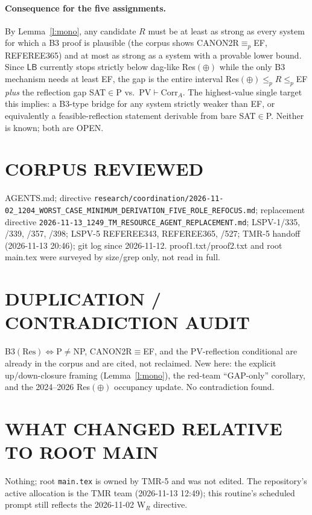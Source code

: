 \documentclass[11pt]{article}
\begin{document}
\paragraph{Consequence for the five assignments.}
By Lemma~\ref{l:mono}, any candidate $R$ must be at least as strong as every
system for which a B3 proof is plausible (the corpus shows CANON2R$\equiv_p$EF,
REFEREE365) and at most as strong as a system with a provable lower bound.
Since $\mathsf{LB}$ currently stops strictly below dag-like Res$(\oplus)$ while
the only B3 mechanism needs at least EF, the gap is the entire interval
Res$(\oplus)\le_p R\le_p$EF \emph{plus} the reflection gap
SAT$\in$P vs.\ PV$\vdash$Corr$_A$. The highest-value single target this
implies: a B3-type bridge for any system strictly weaker than EF, or
equivalently a feasible-reflection statement derivable from bare SAT$\in$P.
Neither is known; both are OPEN.

\section*{CORPUS REVIEWED}
AGENTS.md; directive \texttt{research/coordination/2026-11-02\_1204\_WORST\_CASE\_MINIMUM\_DERIVATION\_FIVE\_ROLE\_REFOCUS.md};
replacement directive \texttt{2026-11-13\_1249\_TM\_RESOURCE\_AGENT\_REPLACEMENT.md};
LSPV-1/335, /339, /357, /398; LSPV-5 REFEREE343, REFEREE365, /527;
TMR-5 handoff (2026-11-13 20:46); git log since 2026-11-12. proof1.txt/proof2.txt
and root main.tex were surveyed by size/grep only, not read in full.

\section*{DUPLICATION / CONTRADICTION AUDIT}
B3$(\mathrm{Res})\Leftrightarrow$P$\ne$NP, CANON2R$\equiv$EF, and the PV-reflection
conditional are already in the corpus and are cited, not reclaimed. New here:
the explicit up/down-closure framing (Lemma~\ref{l:mono}), the red-team
``GAP-only'' corollary, and the 2024--2026 Res$(\oplus)$ occupancy update. No
contradiction found.

\section*{WHAT CHANGED RELATIVE TO ROOT MAIN}
Nothing; root \texttt{main.tex} is owned by TMR-5 and was not edited. The
repository's active allocation is the TMR team (2026-11-13 12:49); this
routine's scheduled prompt still reflects the 2026-11-02 W$_R$ directive.
\end{document}
